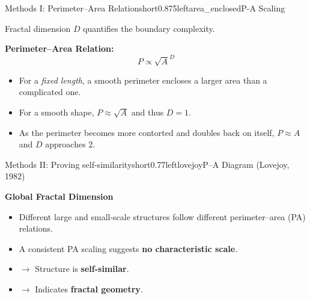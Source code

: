 \documentclass[hyperref={pdfpagelabels=false}, aspectratio=169, t]{beamer}  %
\begin{document}
\begin{graphicsFrame}{Methods I: Perimeter–Area Relation}{short}{0.875}{left}{area_enclosed}{P-A Scaling}

	Fractal dimension \( D \) quantifies the boundary complexity.

	\vspace{0.8em}

	\textbf{Perimeter–Area Relation:}
	\begin{equation}
		P \propto \sqrt{A}^{D}
	\end{equation}
		
	
	\vspace{1.2em}
	
	\begin{itemize}
		\item For a \textit{fixed length}, a smooth perimeter encloses a larger area than a complicated one.
		\item For a smooth shape, $P \approx \sqrt{A}$ and thus $D=1$. %
		\item As the perimeter becomes more contorted and doubles back on itself, $P \approx A$ and $D$ approaches 2. %
	\end{itemize}
	
\end{graphicsFrame}

\begin{graphicsFrame}{Methods II: Proving self-similarity}{short}{0.77}{left}{lovejoy}{P–A Diagram (Lovejoy, 1982)}

\textbf{Global Fractal Dimension}
	\begin{itemize}
		\item Different large and small-scale structures follow different perimeter–area (PA) relations.
		\item A consistent PA scaling suggests \textbf{no characteristic scale}.
		\item $\rightarrow$ Structure is \textbf{self-similar}.
		\item $\rightarrow$ Indicates \textbf{fractal geometry}.
	\end{itemize}

\end{graphicsFrame}
\end{document}
